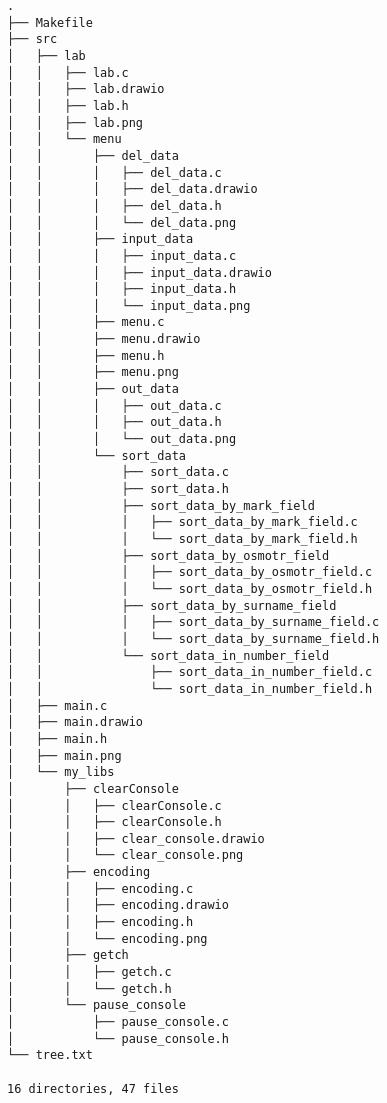 \begin{verbatim}
.
├── Makefile
├── src
│   ├── lab
│   │   ├── lab.c
│   │   ├── lab.drawio
│   │   ├── lab.h
│   │   ├── lab.png
│   │   └── menu
│   │       ├── del_data
│   │       │   ├── del_data.c
│   │       │   ├── del_data.drawio
│   │       │   ├── del_data.h
│   │       │   └── del_data.png
│   │       ├── input_data
│   │       │   ├── input_data.c
│   │       │   ├── input_data.drawio
│   │       │   ├── input_data.h
│   │       │   └── input_data.png
│   │       ├── menu.c
│   │       ├── menu.drawio
│   │       ├── menu.h
│   │       ├── menu.png
│   │       ├── out_data
│   │       │   ├── out_data.c
│   │       │   ├── out_data.h
│   │       │   └── out_data.png
│   │       └── sort_data
│   │           ├── sort_data.c
│   │           ├── sort_data.h
│   │           ├── sort_data_by_mark_field
│   │           │   ├── sort_data_by_mark_field.c
│   │           │   └── sort_data_by_mark_field.h
│   │           ├── sort_data_by_osmotr_field
│   │           │   ├── sort_data_by_osmotr_field.c
│   │           │   └── sort_data_by_osmotr_field.h
│   │           ├── sort_data_by_surname_field
│   │           │   ├── sort_data_by_surname_field.c
│   │           │   └── sort_data_by_surname_field.h
│   │           └── sort_data_in_number_field
│   │               ├── sort_data_in_number_field.c
│   │               └── sort_data_in_number_field.h
│   ├── main.c
│   ├── main.drawio
│   ├── main.h
│   ├── main.png
│   └── my_libs
│       ├── clearConsole
│       │   ├── clearConsole.c
│       │   ├── clearConsole.h
│       │   ├── clear_console.drawio
│       │   └── clear_console.png
│       ├── encoding
│       │   ├── encoding.c
│       │   ├── encoding.drawio
│       │   ├── encoding.h
│       │   └── encoding.png
│       ├── getch
│       │   ├── getch.c
│       │   └── getch.h
│       └── pause_console
│           ├── pause_console.c
│           └── pause_console.h
└── tree.txt

16 directories, 47 files
\end{verbatim}
